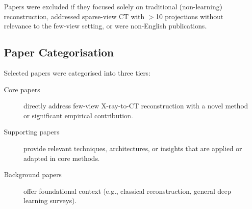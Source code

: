 Papers were excluded if they focused solely on traditional (non-learning) reconstruction, addressed sparse-view CT with $>$10 projections without relevance to the few-view setting, or were non-English publications.

\subsection{Paper Categorisation}

Selected papers were categorised into three tiers:
\begin{description}
  \item[Core papers] directly address few-view X-ray-to-CT reconstruction with a novel method or significant empirical contribution.
  \item[Supporting papers] provide relevant techniques, architectures, or insights that are applied or adapted in core methods.
  \item[Background papers] offer foundational context (e.g., classical reconstruction, general deep learning surveys).
\end{description}


